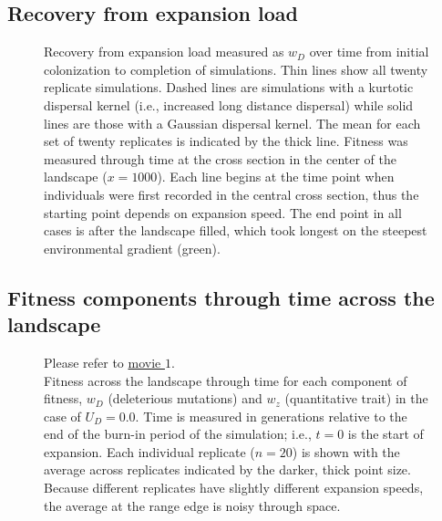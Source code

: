 \newpage{}




\subsection*{Recovery from expansion load}


\begin{figure}[h!]
\centering
{}
\caption[ ~ - Recovery from expansion load.]{Recovery from expansion load measured as $w_D$ over time from initial colonization to completion of simulations. Thin lines show all twenty replicate simulations. Dashed lines are simulations with a kurtotic dispersal kernel (i.e., increased long distance dispersal) while solid lines are those with a Gaussian dispersal kernel. The mean for each set of twenty replicates is indicated by the thick line. Fitness was measured through time at the cross section in the center of the landscape ($x = 1000$). Each line begins at the time point when individuals were first recorded in the central cross section, thus the starting point depends on expansion speed. The end point in all cases is after the landscape filled, which took longest on the steepest environmental gradient (green).}
\label{fig:recovery}
\end{figure}


\newpage{}

\subsection{Fitness components through time across the landscape}

\begin{figure}[h!]
\caption[ ~ - Fitness across the landscape through time for each component of fitness for $U_D = 0.0$.]{Please refer to \href{http://www.zoology.ubc.ca/~kgilbert/PopFitness_U0.mp4}{movie $1$}. \\ Fitness across the landscape through time for each component of fitness, $w_D$ (deleterious mutations) and $w_z$ (quantitative trait) in the case of $U_D = 0.0$. Time is measured in generations relative to the end of the burn-in period of the simulation; i.e., $t = 0$ is the start of expansion. Each individual replicate ($n = 20$) is shown with the average across replicates indicated by the darker, thick point size. Because different replicates have slightly different expansion speeds, the average at the range edge is noisy through space.}
\label{fig:fitmov1}
\end{figure}

